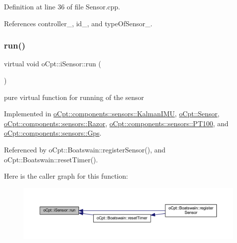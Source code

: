 Definition at line 36 of file Sensor.\+cpp.



References controller\+\_\+, id\+\_\+, and type\+Of\+Sensor\+\_\+.

\hypertarget{classo_cpt_1_1i_sensor_abbface05a16b17354c23389d9747bf7c}{}\label{classo_cpt_1_1i_sensor_abbface05a16b17354c23389d9747bf7c} 
\subsubsection{\texorpdfstring{run()}{run()}}
{\footnotesize\ttfamily virtual void o\+Cpt\+::i\+Sensor\+::run (\begin{DoxyParamCaption}{ }\end{DoxyParamCaption})\hspace{0.3cm}{\ttfamily [pure virtual]}}

pure virtual function for running of the sensor 

Implemented in \hyperlink{classo_cpt_1_1components_1_1sensors_1_1_kalman_i_m_u_abd725cf96ffa29379c496bed243a520a}{o\+Cpt\+::components\+::sensors\+::\+Kalman\+I\+MU}, \hyperlink{classo_cpt_1_1_sensor_aef25b0e5f3a8358ee81c97c73909fbe6}{o\+Cpt\+::\+Sensor}, \hyperlink{classo_cpt_1_1components_1_1sensors_1_1_razor_ad93891ffb2d47e56d1417f0a40026c6e}{o\+Cpt\+::components\+::sensors\+::\+Razor}, \hyperlink{classo_cpt_1_1components_1_1sensors_1_1_p_t100_a41dfc55a4be7993949feeb5ac013690d}{o\+Cpt\+::components\+::sensors\+::\+P\+T100}, and \hyperlink{classo_cpt_1_1components_1_1sensors_1_1_gps_af703c48b8b7220a1909570f46edae932}{o\+Cpt\+::components\+::sensors\+::\+Gps}.



Referenced by o\+Cpt\+::\+Boatswain\+::register\+Sensor(), and o\+Cpt\+::\+Boatswain\+::reset\+Timer().

Here is the caller graph for this function\+:\nopagebreak
\begin{figure}[H]
\begin{center}
\leavevmode
\includegraphics[width=350pt]{classo_cpt_1_1i_sensor_abbface05a16b17354c23389d9747bf7c_icgraph}
\end{center}
\end{figure}
\hypertarget{classo_cpt_1_1i_sensor_a2dec47e27c1e0843a1f874e28a522abd}{}\label{classo_cpt_1_1i_sensor_a2dec47e27c1e0843a1f874e28a522abd} 
